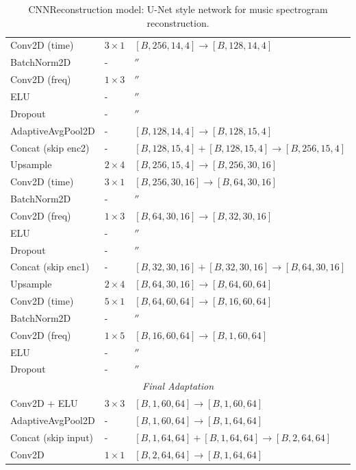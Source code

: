 \begin{table}[h]
\begin{tabular}{l|ll}
Conv2D (time) & $3 \times 1$ & $[B, 256, 14, 4] \to [B, 128, 14, 4]$ \\
BatchNorm2D & - & $''$ \\
Conv2D (freq) & $1 \times 3$ & $''$ \\
ELU & - & $''$ \\
Dropout & - & $''$ \\
AdaptiveAvgPool2D & - & $[B, 128, 14, 4] \to [B, 128, 15, 4]$ \\
\hline
Concat (skip enc2) & - & $[B, 128, 15, 4] + [B, 128, 15, 4] \to [B, 256, 15, 4]$ \\
Upsample & $2 \times 4$ & $[B, 256, 15, 4] \to [B, 256, 30, 16]$ \\
Conv2D (time) & $3 \times 1$ & $[B, 256, 30, 16] \to [B, 64, 30, 16]$ \\
BatchNorm2D & - & $''$ \\
Conv2D (freq) & $1 \times 3$ & $[B, 64, 30, 16] \to [B, 32, 30, 16]$ \\
ELU & - & $''$ \\
Dropout & - & $''$ \\
\hline
Concat (skip enc1) & - & $[B, 32, 30, 16] + [B, 32, 30, 16] \to [B, 64, 30, 16]$ \\
Upsample & $2 \times 4$ & $[B, 64, 30, 16] \to [B, 64, 60, 64]$ \\
Conv2D (time) & $5 \times 1$ & $[B, 64, 60, 64] \to [B, 16, 60, 64]$ \\
BatchNorm2D & - & $''$ \\
Conv2D (freq) & $1 \times 5$ & $[B, 16, 60, 64] \to [B, 1, 60, 64]$ \\
ELU & - & $''$ \\
Dropout & - & $''$ \\
\hline
\multicolumn{3}{c}{\textit{Final Adaptation}} \\
\hline
Conv2D + ELU & $3 \times 3$ & $[B, 1, 60, 64] \to [B, 1, 60, 64]$ \\
AdaptiveAvgPool2D & - & $[B, 1, 60, 64] \to [B, 1, 64, 64]$ \\
Concat (skip input) & - & $[B, 1, 64, 64] + [B, 1, 64, 64] \to [B, 2, 64, 64]$ \\
Conv2D & $1 \times 1$ & $[B, 2, 64, 64] \to [B, 1, 64, 64]$ \\
\hline
\end{tabular}
\caption{CNNReconstruction model: U-Net style network for music spectrogram reconstruction.}
\label{tab:cnn-reconstruction-layers}
\end{table}


